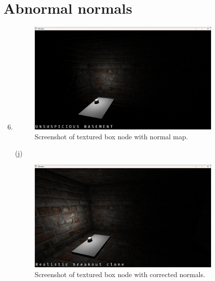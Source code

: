 \documentclass[11pt,a4paper]{report}
\begin{document}
\section{Abnormal normals}
\begin{enumerate}[label=(\alph*)]\setcounter{enumi}{5}
		\item \hfill
		
		\begin{figure}[h]
			\centering
			\includegraphics[width=0.9\textwidth]{images/task3f.png}
			\caption{Screenshot of textured box node with normal map.}
		\end{figure}
	
	\item[(j)] \hfill
	
	\begin{figure}[h]
		\centering
		\includegraphics[width=0.9\textwidth]{images/task3j.png}
		\caption{Screenshot of textured box node with corrected normals.}
	\end{figure}
		
\end{enumerate}
\end{document}
